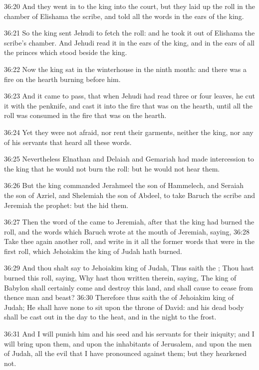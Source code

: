 36:20 And they went in to the king into the court, but they laid up
the roll in the chamber of Elishama the scribe, and told all the words
in the ears of the king.

36:21 So the king sent Jehudi to fetch the roll: and he took it out of
Elishama the scribe's chamber. And Jehudi read it in the ears of the
king, and in the ears of all the princes which stood beside the king.

36:22 Now the king sat in the winterhouse in the ninth month: and
there was a fire on the hearth burning before him.

36:23 And it came to pass, that when Jehudi had read three or four
leaves, he cut it with the penknife, and cast it into the fire that
was on the hearth, until all the roll was consumed in the fire that
was on the hearth.

36:24 Yet they were not afraid, nor rent their garments, neither the
king, nor any of his servants that heard all these words.

36:25 Nevertheless Elnathan and Delaiah and Gemariah had made
intercession to the king that he would not burn the roll: but he would
not hear them.

36:26 But the king commanded Jerahmeel the son of Hammelech, and
Seraiah the son of Azriel, and Shelemiah the son of Abdeel, to take
Baruch the scribe and Jeremiah the prophet: but the \LORD hid them.

36:27 Then the word of the \LORD came to Jeremiah, after that the king
had burned the roll, and the words which Baruch wrote at the mouth of
Jeremiah, saying, 36:28 Take thee again another roll, and write in it
all the former words that were in the first roll, which Jehoiakim the
king of Judah hath burned.

36:29 And thou shalt say to Jehoiakim king of Judah, Thus saith the
\LORD; Thou hast burned this roll, saying, Why hast thou written
therein, saying, The king of Babylon shall certainly come and destroy
this land, and shall cause to cease from thence man and beast?  36:30
Therefore thus saith the \LORD of Jehoiakim king of Judah; He shall
have none to sit upon the throne of David: and his dead body shall be
cast out in the day to the heat, and in the night to the frost.

36:31 And I will punish him and his seed and his servants for their
iniquity; and I will bring upon them, and upon the inhabitants of
Jerusalem, and upon the men of Judah, all the evil that I have
pronounced against them; but they hearkened not.

